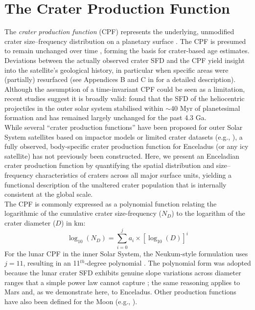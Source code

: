 \documentclass[preprint,11pt,3p,times,authoryear]{elsarticle}
\begin{document}
\section{The Crater Production Function}
\label{subsec:intro_cpf}
The \textit{crater production function} (CPF) represents the underlying, unmodified crater size–frequency distribution on a planetary surface \citep{Neukum1975}. The CPF is presumed to remain unchanged over time \citep{Neukum1975,Neukum1983,Werner2014,Werner2023}, forming the basis for crater-based age estimates. Deviations between the actually observed crater SFD and the CPF yield insight into the satellite's geological history, in particular when specific areas were (partially) resurfaced (see Appendices B and C in \citet{Werner2009} for a detailed description).
Although the assumption of a time-invariant CPF could be seen as a limitation, recent studies suggest it is broadly valid: \citet{Bottke2024} found that the SFD of the heliocentric projectiles in the outer solar system stabilised within $\sim$40 Myr of planetesimal formation and has remained largely unchanged for the past 4.3 Ga.\\

While several ``crater production functions'' have been proposed for outer Solar System satellites based on impactor models or limited crater datasets (e.g., \citealt{Zahnle2003, Kirchoff2009, Singer2019, Wong2023}), a fully observed, body-specific crater production function for Enceladus (or any icy satellite) has not previously been constructed. Here, we present an Enceladian crater production function by quantifying the spatial distribution and size–frequency characteristics of craters across all major surface units, yielding a functional description of the unaltered crater population that is internally consistent at the global scale. \\

The CPF is commonly expressed as a polynomial function relating the logarithmic of the cumulative crater size-frequency ($N_{D}$) to the logarithm of the crater diameter ($D$) in km:
\begin{equation}
  \log_{10}(N_{D}) = \sum_{i=0}^{j} a_{i} \times [\log_{10}(D)]^i
  \label{eq:cpf}
\end{equation}
For the lunar CPF in the inner Solar System, the Neukum-style formulation uses $j = 11$, resulting in an 11$^{th}$-degree polynomial \citep{Neukum2001}. The polynomial form was adopted because the lunar crater SFD exhibits genuine slope variations across diameter ranges that a simple power law cannot capture \citep{Neukum1983}; the same reasoning applies to Mars \citep{Ivanov2001} and, as we demonstrate here, to Enceladus. Other production functions have also been defined for the Moon (e.g., \citealt{Marchi2009}).\\
\end{document}
